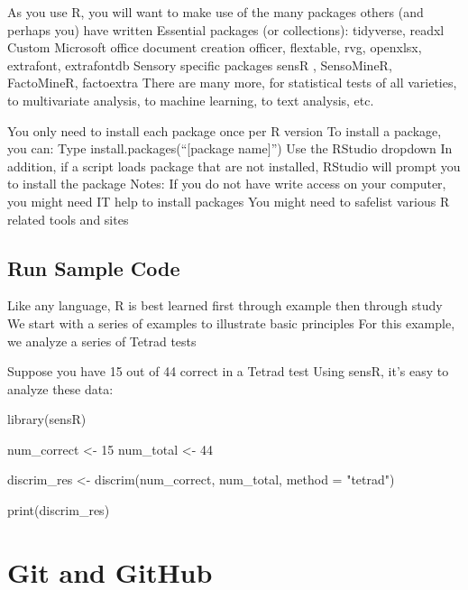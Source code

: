 \documentclass[
]{book}
\newenvironment{Shaded}{\begin{snugshade}}{\end{snugshade}}
\newcommand{\AttributeTok}[1]{\textcolor[rgb]{0.77,0.63,0.00}{#1}}
\newcommand{\DecValTok}[1]{\textcolor[rgb]{0.00,0.00,0.81}{#1}}
\newcommand{\FunctionTok}[1]{\textcolor[rgb]{0.00,0.00,0.00}{#1}}
\newcommand{\NormalTok}[1]{#1}
\newcommand{\OtherTok}[1]{\textcolor[rgb]{0.56,0.35,0.01}{#1}}
\newcommand{\StringTok}[1]{\textcolor[rgb]{0.31,0.60,0.02}{#1}}
\begin{document}
As you use R, you will want to make use of the many packages others (and perhaps you) have written
Essential packages (or collections):
tidyverse, readxl
Custom Microsoft office document creation
officer, flextable, rvg, openxlsx, extrafont, extrafontdb
Sensory specific packages
sensR , SensoMineR, FactoMineR, factoextra
There are many more, for statistical tests of all varieties, to multivariate analysis, to machine learning, to text analysis, etc.

You only need to install each package once per R version
To install a package, you can:
Type install.packages(``{[}package name{]}'')
Use the RStudio dropdown
In addition, if a script loads package that are not installed, RStudio will prompt you to install the package
Notes:
If you do not have write access on your computer, you might need IT help to install packages
You might need to safelist various R related tools and sites

\hypertarget{run-sample-code}{%
\subsection{Run Sample Code}\label{run-sample-code}}

Like any language, R is best learned first through example then through study
We start with a series of examples to illustrate basic principles
For this example, we analyze a series of Tetrad tests

Suppose you have 15 out of 44 correct in a Tetrad test
Using sensR, it's easy to analyze these data:

\begin{Shaded}
\begin{Highlighting}[]
\FunctionTok{library}\NormalTok{(sensR)}

\NormalTok{num\_correct }\OtherTok{\textless{}{-}} \DecValTok{15}  
\NormalTok{num\_total }\OtherTok{\textless{}{-}} \DecValTok{44}  
  
\NormalTok{discrim\_res }\OtherTok{\textless{}{-}} \FunctionTok{discrim}\NormalTok{(num\_correct, num\_total, }\AttributeTok{method =} \StringTok{"tetrad"}\NormalTok{)  }
  
\FunctionTok{print}\NormalTok{(discrim\_res)  }
\end{Highlighting}
\end{Shaded}

\hypertarget{git-and-github}{%
\section{Git and GitHub}\label{git-and-github}}
\end{document}
